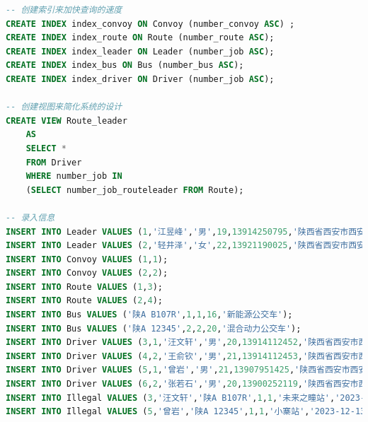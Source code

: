 \documentclass {article}
\begin{document}
\begin{lstlisting}[language=SQL]
-- 创建索引来加快查询的速度
CREATE INDEX index_convoy ON Convoy (number_convoy ASC) ;
CREATE INDEX index_route ON Route (number_route ASC);
CREATE INDEX index_leader ON Leader (number_job ASC);
CREATE INDEX index_bus ON Bus (number_bus ASC);
CREATE INDEX index_driver ON Driver (number_job ASC);

-- 创建视图来简化系统的设计
CREATE VIEW Route_leader
	AS
	SELECT * 
	FROM Driver
	WHERE number_job IN
	(SELECT number_job_routeleader FROM Route);

-- 录入信息
INSERT INTO Leader VALUES (1,'江昱峰','男',19,13914250795,'陕西省西安市西安电子科技大学南校区海棠十号楼二区302左室');
INSERT INTO Leader VALUES (2,'轻井泽','女',22,13921190025,'陕西省西安市西安电子科技大学南校区丁香十四号楼一区606右室');
INSERT INTO Convoy VALUES (1,1);
INSERT INTO Convoy VALUES (2,2);
INSERT INTO Route VALUES (1,3);
INSERT INTO Route VALUES (2,4);
INSERT INTO Bus VALUES ('陕A B107R',1,1,16,'新能源公交车');
INSERT INTO Bus VALUES ('陕A 12345',2,2,20,'混合动力公交车');
INSERT INTO Driver VALUES (3,1,'汪文轩','男',20,13914112452,'陕西省西安市西安电子科技大学南校区海棠十号楼二区302左室');
INSERT INTO Driver VALUES (4,2,'王俞钦','男',21,13914112453,'陕西省西安市西安电子科技大学南校区海棠十号楼二区304右室');
INSERT INTO Driver VALUES (5,1,'曾岩','男',21,13907951425,'陕西省西安市西安电子科技大学南校区海棠十号楼二区302左室');
INSERT INTO Driver VALUES (6,2,'张若石','男',20,13900252119,'陕西省西安市西安电子科技大学南校区海棠十号楼二区302左室');
INSERT INTO Illegal VALUES (3,'汪文轩','陕A B107R',1,1,'未来之瞳站','2023-12-13 15:31:30','闯红灯');
INSERT INTO Illegal VALUES (5,'曾岩','陕A 12345',1,1,'小寨站','2023-12-13 19:36:03','闯红灯');
		\end{lstlisting}
	
\end{document}
